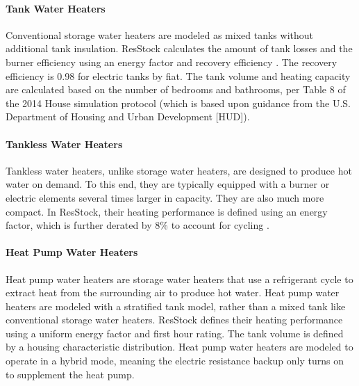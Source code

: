 \paragraph{Tank Water Heaters}
Conventional storage water heaters are modeled as mixed tanks without additional tank insulation. ResStock calculates the amount of tank losses and the burner efficiency using an energy factor and recovery efficiency \citep{tank_model_parameters}. The recovery efficiency is 0.98 for electric tanks by fiat. The tank volume and heating capacity are calculated based on the number of bedrooms and bathrooms, per Table 8 of the 2014 House simulation protocol (which is based upon guidance from the U.S. Department of Housing and Urban Development [HUD]).

\paragraph{Tankless Water Heaters}
Tankless water heaters, unlike storage water heaters, are designed to produce hot water on demand. To this end, they are typically equipped with a burner or electric elements several times larger in capacity. They are also much more compact. In ResStock, their heating performance is defined using an energy factor, which is further derated by 8\% to account for cycling \citep{ansi_resnet_301_2019}.

\paragraph{Heat Pump Water Heaters}
Heat pump water heaters are storage water heaters that use a refrigerant cycle to extract  heat from the surrounding air to produce hot water. Heat pump water heaters are modeled with a stratified tank model, rather than a mixed tank like conventional storage water heaters. ResStock defines their heating performance using a uniform energy factor and first hour rating.  The tank volume is defined by a housing characteristic distribution. Heat pump water heaters are modeled to operate in a hybrid mode, meaning the electric resistance backup only turns on to supplement the heat pump. 


